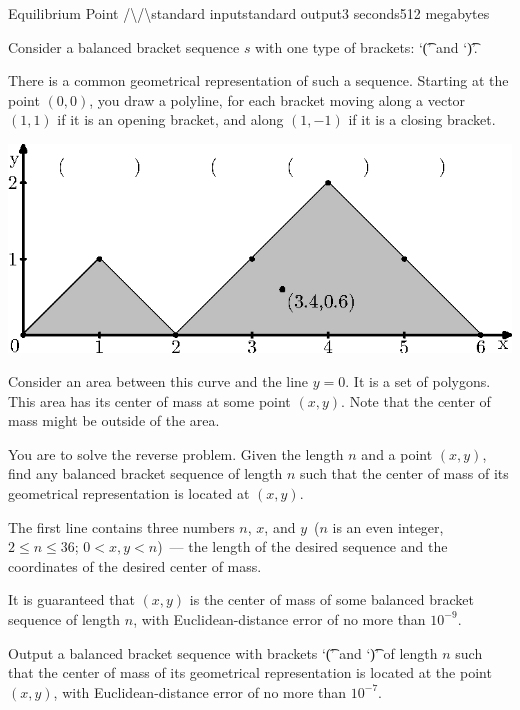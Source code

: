 \begin{problem}{Equilibrium Point /\textbackslash/\textbackslash}{standard input}{standard output}{3 seconds}{512 megabytes}

Consider a balanced bracket sequence $s$ with one type of brackets: `\t{(}' and `\t{)}'.

There is a common geometrical representation of such a sequence. Starting at the point $(0, 0)$, you draw a polyline, for each bracket moving along a vector $(1, 1)$ if it is an opening bracket, and along $(1, -1)$ if it is a closing bracket.


\begin{center}
\includegraphics{equilibrium.0.eps}
\end{center}


Consider an area between this curve and the line $y=0$. It is a set of polygons. This area has its center of mass at some point $(x, y)$. Note that the center of mass might be outside of the area.

You are to solve the reverse problem. Given the length $n$ and a point $(x, y)$, find any balanced bracket sequence of length $n$ such that the center of mass of its geometrical representation is located at $(x, y)$.

\InputFile
The first line contains three numbers $n$, $x$, and $y$~($n$ is an even integer, $2 \le n \le 36$; $0 < x, y < n$)~--- the length of the desired sequence and the coordinates of the desired center of mass.

It is guaranteed that $(x, y)$ is the center of mass of some balanced bracket sequence of length $n$, with Euclidean-distance error of no more than $10^{-9}$.

\OutputFile
Output a balanced bracket sequence with brackets `\t{(}' and `\t{)}' of length $n$ such that the center of mass of its geometrical representation is located at the point $(x, y)$, with Euclidean-distance error of no more than $10^{-7}$.

\Example

\begin{example}
%
\end{example}

\end{problem}

